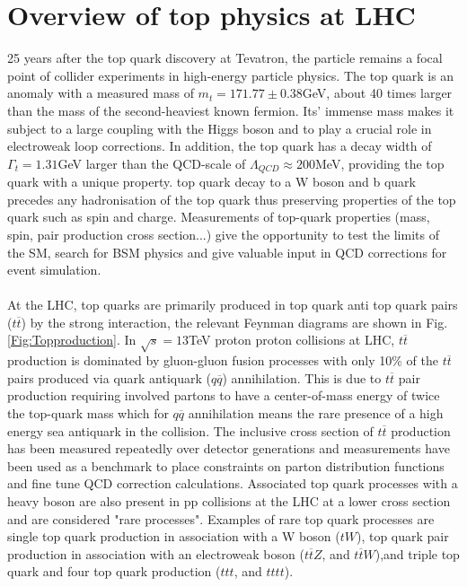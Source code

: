 \section{Overview of top physics at LHC}
25 years after the top quark discovery at Tevatron\cite{RevModPhys.69.137}, the particle remains a focal point of collider experiments in high-energy particle physics. The top quark is an anomaly with a measured mass of $m_t = 171.77 \pm 0.38$GeV\cite{CMS:2022kcl}, about 40 times larger than
the mass of the second-heaviest known fermion. Its' immense mass makes it subject to a large coupling with the Higgs boson and to play a crucial role in electroweak loop corrections. In addition, the top quark has a decay width of $\Gamma_t=1.31$GeV larger than the QCD-scale of $\Lambda_{QCD} \approx 200$MeV, providing the top quark with a unique property. top quark decay to a W boson and b quark precedes any hadronisation of the top quark thus preserving properties of the top quark such as spin and charge. Measurements of top-quark properties (mass, spin, pair production cross section...) give the opportunity to test the limits of the SM, search for BSM physics and give valuable input in QCD corrections for event simulation.\\
\\
At the LHC, top quarks are primarily produced in top quark anti top quark pairs ($t\overline{t}$) by the strong interaction, the relevant Feynman diagrams are shown in Fig. \ref{Fig:Topproduction}. In $\sqrt{s}=13$TeV proton proton collisions at LHC, $t\overline{t}$ production is dominated by gluon-gluon fusion processes with only 10\% of the $t\overline{t}$ pairs produced via quark antiquark ($q\overline{q}$) annihilation. This is due to $t\overline{t}$ pair production requiring involved partons to have a center-of-mass energy of twice the top-quark mass which for $q\overline{q}$ annihilation means the rare presence of a high energy sea antiquark in the collision. The inclusive cross section of $t\overline{t}$ production has been measured repeatedly over detector generations\cite{2020,CMS:2022elr,2013} and measurements have been used as a benchmark to place constraints on parton distribution functions and fine tune QCD correction calculations. Associated top quark processes with a heavy boson are also present in pp collisions at the LHC at a lower cross section and are considered "rare processes". Examples of rare top quark processes are single top quark production in association with a W boson ($tW$), top quark pair production in association with an electroweak boson ($t\overline{t}Z$, and $t\overline{t}W$),and triple top quark and four top quark production ($ttt$, and $tttt$).\\
